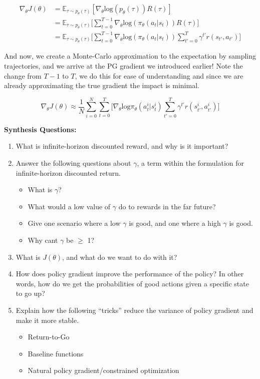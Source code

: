    \begin{align*}
        \nabla_\theta J(\theta) &= \mathbb{E}_{\tau \sim p_\theta(\tau)}[\nabla_\theta \mathrm{log}(p_\theta(\tau)) R(\tau)] \\
        &= \mathbb{E}_{\tau \sim p_\theta(\tau)}\biggl[\sum_{t=0}^{T-1} \nabla_\theta\mathrm{log}(\pi_\theta(a_t|s_t))R(\tau)\biggr]\\
        &= \mathbb{E}_{\tau \sim p_\theta(\tau)}\biggl[\sum_{t=0}^{T-1} \nabla_\theta\mathrm{log}(\pi_\theta(a_t|s_t))\sum_{t'=0}^T \gamma^{t'} r(s_{t'}, a_{t'})\biggr]
    \end{align*}

    And now, we create a Monte-Carlo approximation to the expectation by sampling trajectories, and we arrive at the PG gradient we introduced earlier! Note the change from $T-1$ to $T$, we do this for ease of understanding and since we are already approximating the true gradient the impact is minimal.

    $$\nabla_\theta J(\theta) \approx \frac{1}{N}\sum_{i=0}^N\sum_{t=0}^T\biggl[ \nabla_\theta \mathrm{log}\pi_\theta(a_t^i|s_t^i)\sum_{t'=0}^T \gamma^{t'} r(s_{t'}^i, a_{t'}^i)\biggr]$$

\begin{questionbox}
\textbf{Synthesis Questions:}
\begin{enumerate}
    \item What is infinite-horizon discounted reward, and why is it important?
    \item Answer the following questions about $\gamma$, a term within the formulation for infinite-horizon discounted return.
    \begin{itemize}
        \item What is $\gamma$?
        \item What would a low value of $\gamma$ do to rewards in the far future?
        \item Give one scenario where a low $\gamma$ is good, and one where a high $\gamma$ is good.
        \item Why cant $\gamma$ be $\geq$ 1?
    \end{itemize}
    \item What is $J(\theta)$, and what do we want to do with it?
    \item How does policy gradient improve the performance of the policy? In other words, how do we get the probabilities of good actions given a specific state to go up?
    \item Explain how the following ``tricks'' reduce the variance of policy gradient and make it more stable.
    \begin{itemize}
        \item Return-to-Go
        \item Baseline functions
        \item Natural policy gradient/constrained optimization
    \end{itemize}
\end{enumerate}
\end{questionbox}


